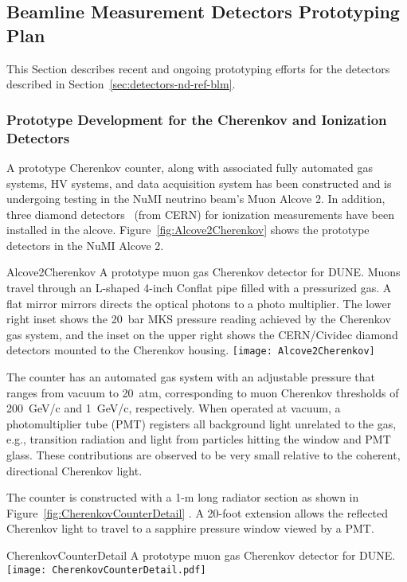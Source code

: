 \subsection{Beamline Measurement Detectors Prototyping Plan}
\label{sec:proto-nd-blm}
This Section describes recent and ongoing prototyping efforts for the detectors described in Section~\ref{sec:detectors-nd-ref-blm}.


\subsubsection{Prototype Development for the Cherenkov and Ionization Detectors}
\label{subsec:proto-blm-muon-cherenkov-proto}

A prototype Cherenkov counter, along with associated fully automated
gas systems, HV systems, and data acquisition system has been
constructed and is undergoing testing in the NuMI neutrino beam's Muon
Alcove 2. In addition, three diamond detectors~\cite{ref:CERNdiamond} (from CERN)
for ionization measurements have  been installed in the alcove. 
Figure~\ref{fig:Alcove2Cherenkov} shows the prototype detectors in the
NuMI Alcove 2.
\begin{cdrfigure}{Alcove2Cherenkov}
{A prototype muon gas Cherenkov detector for DUNE.
Muons travel through an L-shaped 4-inch Conflat pipe filled with a
pressurized gas. A flat mirror mirrors directs the optical photons
to a photo multiplier. The lower right inset shows the 20~bar MKS
pressure reading achieved by the Cherenkov gas system, and the inset
on the upper right shows the CERN/Cividec diamond detectors mounted to the Cherenkov housing.}
\texttt{[image: Alcove2Cherenkov]}
\end{cdrfigure}

The counter has an automated gas system with an adjustable %
pressure that
ranges from vacuum to 20~atm, corresponding to muon Cherenkov
thresholds of 200~GeV/c and 1~GeV/c, respectively. When operated at
vacuum, a photomultiplier tube (PMT) registers all background light unrelated to the gas,
e.g., transition radiation and light from particles hitting the window and
PMT glass.  These contributions are observed to be very small relative
to the coherent, directional Cherenkov light.

The counter is constructed with a 1-m long radiator section as shown
in Figure~\ref{fig:CherenkovCounterDetail} . A 20-foot extension
allows the reflected Cherenkov light to travel to a sapphire pressure
window viewed by a PMT.
\begin{cdrfigure}{CherenkovCounterDetail}
{A prototype muon gas Cherenkov detector for DUNE.  }
\texttt{[image: CherenkovCounterDetail.pdf]}
\end{cdrfigure}


